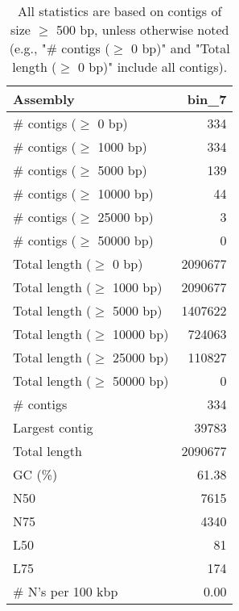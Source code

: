 \documentclass[12pt,a4paper]{article}
\begin{document}
\begin{table}[ht]
\begin{center}
\caption{All statistics are based on contigs of size $\geq$ 500 bp, unless otherwise noted (e.g., "\# contigs ($\geq$ 0 bp)" and "Total length ($\geq$ 0 bp)" include all contigs).}
\begin{tabular}{|l*{1}{|r}|}
\hline
Assembly & bin\_7 \\ \hline
\# contigs ($\geq$ 0 bp) & 334 \\ \hline
\# contigs ($\geq$ 1000 bp) & 334 \\ \hline
\# contigs ($\geq$ 5000 bp) & 139 \\ \hline
\# contigs ($\geq$ 10000 bp) & 44 \\ \hline
\# contigs ($\geq$ 25000 bp) & 3 \\ \hline
\# contigs ($\geq$ 50000 bp) & 0 \\ \hline
Total length ($\geq$ 0 bp) & 2090677 \\ \hline
Total length ($\geq$ 1000 bp) & 2090677 \\ \hline
Total length ($\geq$ 5000 bp) & 1407622 \\ \hline
Total length ($\geq$ 10000 bp) & 724063 \\ \hline
Total length ($\geq$ 25000 bp) & 110827 \\ \hline
Total length ($\geq$ 50000 bp) & 0 \\ \hline
\# contigs & 334 \\ \hline
Largest contig & 39783 \\ \hline
Total length & 2090677 \\ \hline
GC (\%) & 61.38 \\ \hline
N50 & 7615 \\ \hline
N75 & 4340 \\ \hline
L50 & 81 \\ \hline
L75 & 174 \\ \hline
\# N's per 100 kbp & 0.00 \\ \hline
\end{tabular}
\end{center}
\end{table}
\end{document}
